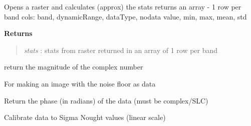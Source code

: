 \documentclass[letterpaper,10pt,openany,oneside]{sphinxmanual}
\begin{document}
\begin{fulllineitems}
\begin{fulllineitems}
\label{code:Image.Image.getImgStats}
Opens a raster and calculates (approx) the stats
returns an array - 1 row per band
cols: band, dynamicRange, dataType, nodata value, min, max, mean, std

\textbf{Returns}
\begin{quote}

\emph{stats} : stats from raster returned in an array of 1 row per band
\end{quote}

\end{fulllineitems}


\begin{fulllineitems}
\label{code:Image.Image.getMag}
return the magnitude of the complex number

\end{fulllineitems}


\begin{fulllineitems}
\label{code:Image.Image.getNoise}
For making an image with the noise floor as data

\end{fulllineitems}


\begin{fulllineitems}
\label{code:Image.Image.getPhase}
Return the phase (in radians) of the data (must be complex/SLC)

\end{fulllineitems}


\begin{fulllineitems}
\label{code:Image.Image.getSigma}
Calibrate data to Sigma Nought values (linear scale)

\end{fulllineitems}



\end{fulllineitems}
\end{document}
